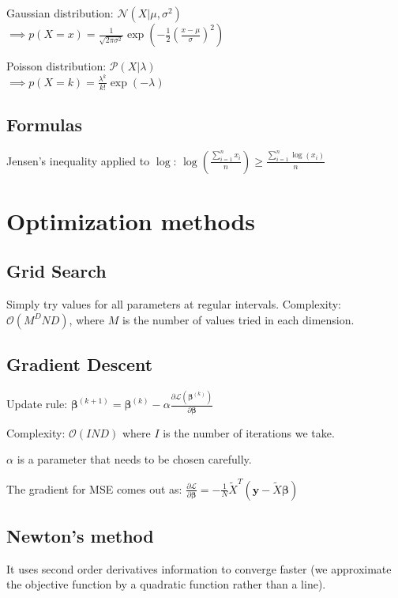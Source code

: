 \documentclass[10pt,a4paper,landscape]{article}
\begin{document}
\begin{multicols*}{4}
Gaussian distribution: $\mathcal{N}(X| \mu, \sigma^2)$ \\
$\implies p(X = x) = \frac{1}{\sqrt{2 \pi \sigma^2}} \exp{(- \frac{1}{2} ( \frac{x - \mu}{\sigma} )^2)}$

Poisson distribution: $\mathcal{P}(X| \lambda)$ \\
$\implies p(X = k) = \frac{\lambda ^ k}{k!} \exp{(- \lambda)}$

\subsection{Formulas}

Jensen's inequality applied to $\log$: $\log ( \frac{\sum_{i=1}^n x_i}{n} ) \geq \frac{\sum_{i=1}^n \log(x_i)}{n}$

\section{Optimization methods}

\subsection{Grid Search}
Simply try values for all parameters at regular intervals.
Complexity: $\mathcal{O}(M^D N D)$, where $M$ is the number of values tried in each dimension.

\subsection{Gradient Descent}
Update rule: $\boldsymbol\beta^{(k+1)} = \boldsymbol\beta^{(k)} - \alpha \frac{\partial \mathcal{L}(\boldsymbol\beta^{(k)})}{\partial \boldsymbol\beta}$

Complexity: $\mathcal{O}(I N D)$ where $I$ is the number of iterations we take.

$\alpha$ is a parameter that needs to be chosen carefully.

The gradient for MSE comes out as:
$\frac{\partial \mathcal{L}}{\partial \boldsymbol\beta} = - \frac{1}{N} \tilde{X}^T ( \boldsymbol y - \tilde{X} \boldsymbol\beta )$

\subsection{Newton's method}
It uses second order derivatives information to converge faster (we approximate the objective function by a quadratic function rather than a line).


\end{multicols*}
\end{document}
